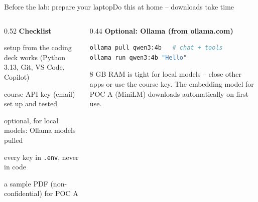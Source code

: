 \documentclass[aspectratio=169,11pt]{beamer}
\begin{document}
\begin{frame}[fragile]{Before the lab: prepare your laptop}{Do this at home -- downloads take time}
  \begin{columns}[T]
    \begin{column}{0.52\textwidth}
      {\small\bfseries\color{cNavy}Checklist}\par\vspace{4pt}
      {\small\raggedright\parindent=0pt%
      \makebox[1.45em][l]{\color{cTeal}\faCheckSquare[regular]}setup from the coding deck works (Python 3.13, Git, VS Code, Copilot)\par\vspace{4pt}
      \makebox[1.45em][l]{\color{cTeal}\faCheckSquare[regular]}course API key (email) set up and tested\par\vspace{4pt}
      \makebox[1.45em][l]{\color{cTeal}\faCheckSquare[regular]}optional, for local models: Ollama models pulled\par\vspace{4pt}
      \makebox[1.45em][l]{\color{cTeal}\faCheckSquare[regular]}every key in \texttt{.env}, never in code\par\vspace{4pt}
      \makebox[1.45em][l]{\color{cTeal}\faCheckSquare[regular]}a sample PDF (non-confidential) for POC A\par}
    \end{column}
    \begin{column}{0.44\textwidth}
      {\small\bfseries\color{cNavy}Optional: Ollama (from ollama.com)}
\begin{lstlisting}[language=bash,basicstyle=\ttfamily\footnotesize\color{cInk}]
ollama pull qwen3:4b   # chat + tools
ollama run qwen3:4b "Hello"
\end{lstlisting}
      \begin{warnbox}
        \footnotesize 8 GB RAM is tight for local models -- close other apps or use the course key. The embedding model for POC A (MiniLM) downloads automatically on first use.
      \end{warnbox}
    \end{column}
  \end{columns}
\end{frame}
\end{document}
